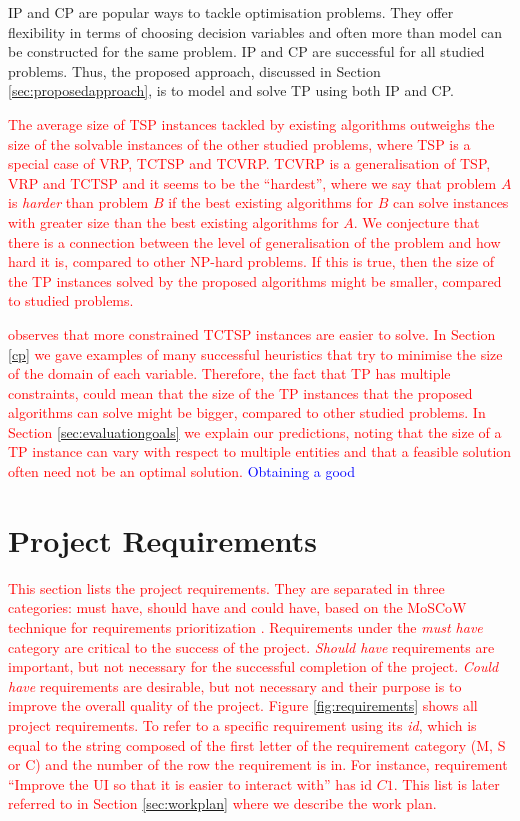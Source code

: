 \documentclass{mprop}
\theoremstyle{definition}
\begin{document}
IP and CP are popular ways to tackle optimisation problems. They offer flexibility in terms of choosing decision variables and often more than model can be constructed for the same problem. IP and CP are successful for all studied problems. Thus, the proposed approach, discussed in Section \ref{sec:proposedapproach}, is to model and solve TP using both IP and CP.

\textcolor{red}{
The average size of TSP instances tackled by existing algorithms outweighs the size of the solvable instances of the other studied problems, where TSP is a special case of VRP, TCTSP and TCVRP. TCVRP is a generalisation of TSP, VRP and TCTSP and it seems to be the ``hardest'', where we say that problem $A$ is \textit{harder} than problem $B$ if the best existing algorithms for $B$ can solve  instances with greater size than the best existing algorithms for $A$.
We conjecture that there is a connection between the level of generalisation of the problem and how hard it is, compared to other NP-hard problems. If this is true, then the size of the TP instances solved by the proposed algorithms might be  smaller, compared to studied problems.}

\textcolor{red}{
\citet{Baker83} observes that more constrained TCTSP instances are easier to solve. In Section \ref{cp} we gave examples of many successful heuristics that try to minimise the size of the domain of each variable. Therefore, the fact that TP has multiple constraints, could mean that the size of the TP instances that the proposed algorithms can solve might be bigger, compared to other studied problems.  In Section \ref{sec:evaluationgoals} we explain our predictions, noting that the size of a TP instance can vary with respect to multiple entities and that a feasible solution often need not be an optimal solution.} \textcolor{blue}{Obtaining a good }


\section{Project Requirements}
\label{sec:requirements}
\textcolor{red}{
This section lists the project requirements. They are separated in three categories: must have, should have and could have, based on the MoSCoW technique for requirements prioritization \citep{ash2007moscow}. Requirements under the \textit{must have} category are critical to the success of the project. \textit{Should have} requirements are important, but not necessary for the successful completion of the project. \textit{Could have} requirements are desirable, but not necessary and their purpose is to improve the overall quality of the project. Figure \ref{fig:requirements} shows all project requirements. To refer to a specific requirement using its \textit{id}, which is equal to the string composed of the first letter of the requirement category (M, S or C) and the number of the row the requirement is in. For instance, requirement ``Improve the UI so that it is easier to interact with'' has id $C1$. This list is later referred to in Section \ref{sec:workplan} where we describe the work plan.}
\end{document}
